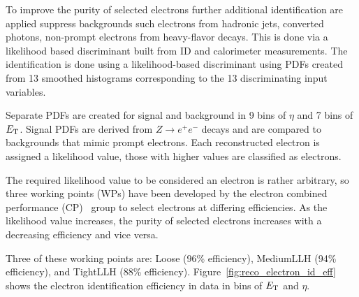 To improve the purity of selected electrons further additional identification are applied suppress backgrounds such electrons from hadronic jets, converted photons, non-prompt electrons from heavy-flavor decays. This is done via a likelihood based discriminant built from ID and calorimeter measurements. The identification is done using a likelihood-based discriminant using PDFs created from 13 smoothed histograms corresponding to the 13 discriminating input variables. 

Separate PDFs are created for signal and background in 9 bins of $\eta$ and 7 bins of $E_{\mathrm{T}}$. Signal PDFs are derived from $Z\rightarrow e^{+}e^{-}$ decays and are compared to backgrounds that mimic prompt electrons. Each reconstructed electron is assigned a likelihood value, those with higher values are classified as electrons. 

The required likelihood value to be considered an electron is rather arbitrary, so three working points (WPs) have been developed by the electron combined performance (CP)~\cite{ATLAS:EGAMPublic} group to select electrons at differing efficiencies. As the likelihood value increases, the purity of selected electrons increases with a decreasing efficiency and vice versa. 

Three of these working points are: Loose (96\% efficiency), MediumLLH (94\% efficiency), and TightLLH (88\% efficiency)\@. Figure~\ref{fig:reco_electron_id_eff} shows the electron identification efficiency in data in bins of $E_{\mathrm{T}}$ and $\eta$.

